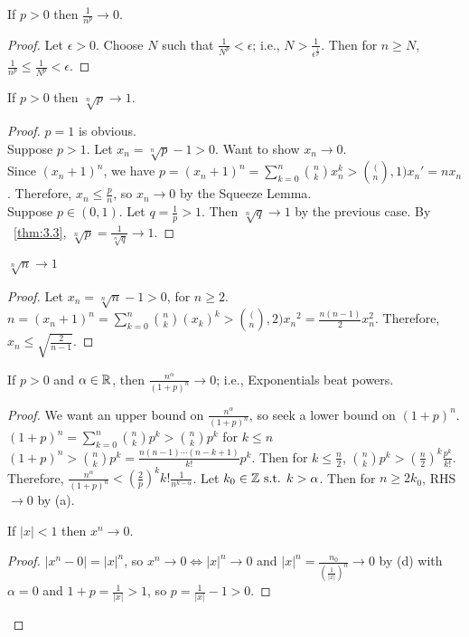 \begin{theorem}
	\label{thm:3.20}
	\begin{enumerate}[label=(\alph*)]
		\item If $p>0$ then $\frac{1}{n^{p}} \to 0$.
		      \begin{proof}
			      Let $\epsilon>0$. Choose $N$ such that $\frac{1}{N^{p}} <\epsilon$; i.e., $N>\frac{1}{\epsilon^{\frac{1}{p}}}$. Then for $n\ge N$, $\frac{1}{n^{p}}  \le \frac{1}{N^{p}} <\epsilon$.
		      \end{proof}
		\item If $p>0$ then $\sqrt[n]{p} \to 1$.
		      \begin{proof}
			      $p=1$ is obvious.\\
			      Suppose $p>1$. Let $x_n=\sqrt[n]{p} -1>0$.
			      Want to show $x_n \to 0$.\\
			      Since $(x_n +1)^{n}$, we have $p=(x_n+1)^{n}=\sum_{k=0}^{n}{\binom{n}{k}x_n ^{k}>\binom(n,1) x_n'=nx_n}$. Therefore, $x_n \le  \frac{p}{n}$, so $x_n \to 0$ by the Squeeze Lemma.
			      \\
			      Suppose $p \in (0,1)$. Let $q=\frac{1}{p}>1$. Then $\sqrt[n]{q} \to 1$ by the previous case. By ~\ref{thm:3.3}, $\sqrt[n]{p} = \frac{1}{\sqrt[n]{q}} \to 1$.
		      \end{proof}
		\item $\sqrt[n]{n}\to 1$
		      \begin{proof}
			      Let $x_n=\sqrt[n]{n}-1>0$, for $n\ge 2$.
			      $n=(x_n+1)^{n}=\sum_{k=0}^{n}{\binom{n}{k}(x_k)^{k}}>\binom(n,2){x_n}^{2}=\frac{n(n-1)}{2} x_n ^2$. Therefore, $x_n \le \sqrt{\frac{2}{n-1}}$.
		      \end{proof}
		\item If $p>0$ and $\alpha \in \mathbb{R}$, then $\frac{n^{\alpha}}{(1+p)^{n}}\to 0$; i.e., Exponentials beat powers.
		      \begin{proof}
			      We want an upper bound on $\frac{n^{\alpha}}{(1+p)^{n}}$, so seek a lower bound on $(1+p)^{n}$.\\
			      $(1+p)^{n}=\sum_{k=0}^{n}\binom{n}{k}p^{k}>\binom{n}{k}p^{k}$ for $k\le n$\\
			      $(1+p)^{n}>\binom{n}{k}p^{k}=\frac{n(n-1) \cdots (n-k+1)}{k!}p^{k}$.
			      Then for $k \le \frac{n}{2}$,  $\binom{n}{k}p^{k} > (\frac{n}{2})^{k}\frac{p^{k}}{k!}$.
			      Therefore, $\frac{n^{\alpha}}{(1+p)^{n}}<(\frac{2}{p})^{k} k! \frac{1}{n^{k-\alpha}}$. Let $k_0 \in \mathbb{Z} \text{ s.t. } k>\alpha$. Then for $n\ge 2 k_0$, RHS $\to 0$ by (a).
			      \item If $|x| <1 $ then $x^{n}\to 0$.
			      \begin{proof}
				      $|x^{n}-0| = |x|^{n}$, so $x^{n}\to 0 \Leftrightarrow |x|^{n}\to 0$ and $|x|^{n}=\frac{n_0}{(\frac{1}{|x|})^{n}}\to 0$ by (d) with $\alpha=0$ and $1+p=\frac{1}{|x|}>1$, so $p=\frac{1}{|x|}-1>0$.
			      \end{proof}
		      \end{proof}
	\end{enumerate}
\end{theorem}

